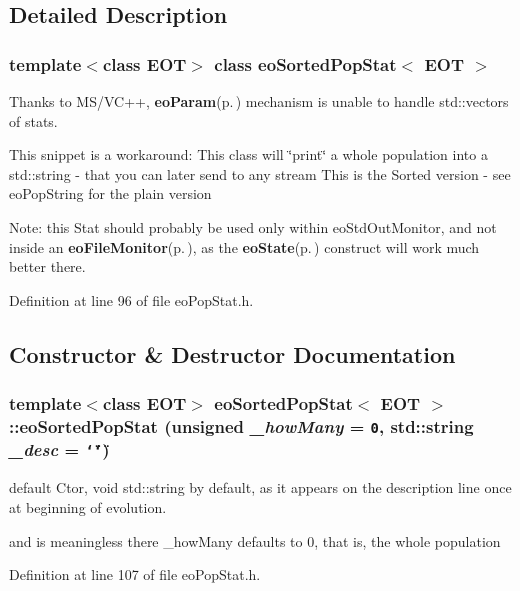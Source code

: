 \subsection{Detailed Description}
\subsubsection*{template$<$class EOT$>$ class eo\-Sorted\-Pop\-Stat$<$ EOT $>$}

Thanks to MS/VC++, {\bf eo\-Param}{\rm (p.\,\pageref{classeo_param})} mechanism is unable to handle std::vectors of stats. 

This snippet is a workaround: This class will \char`\"{}print\char`\"{} a whole population into a std::string - that you can later send to any stream This is the Sorted version - see eo\-Pop\-String for the plain version

Note: this Stat should probably be used only within eo\-Std\-Out\-Monitor, and not inside an {\bf eo\-File\-Monitor}{\rm (p.\,\pageref{classeo_file_monitor})}, as the {\bf eo\-State}{\rm (p.\,\pageref{classeo_state})} construct will work much better there. 



Definition at line 96 of file eo\-Pop\-Stat.h.

\subsection{Constructor \& Destructor Documentation}
\subsubsection{\setlength{\rightskip}{0pt plus 5cm}template$<$class EOT$>$ {\bf eo\-Sorted\-Pop\-Stat}$<$ {\bf EOT} $>$::{\bf eo\-Sorted\-Pop\-Stat} (unsigned {\em \_\-how\-Many} = {\tt 0}, std::string {\em \_\-desc} = {\tt \char`\"{}\char`\"{}})\hspace{0.3cm}{\tt  [inline]}}\label{classeo_sorted_pop_stat_a0}


default Ctor, void std::string by default, as it appears on the description line once at beginning of evolution. 

and is meaningless there \_\-how\-Many defaults to 0, that is, the whole population 

Definition at line 107 of file eo\-Pop\-Stat.h.

